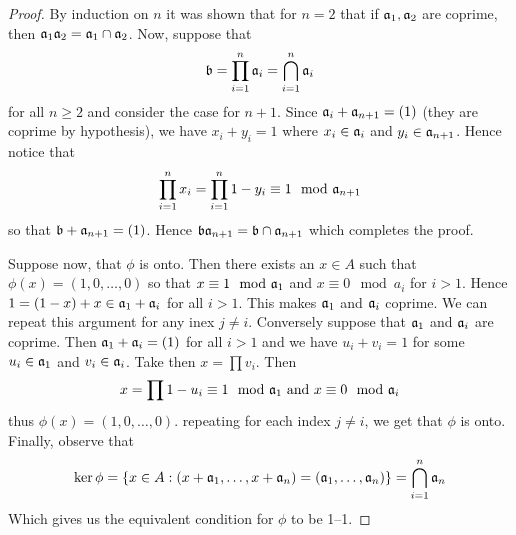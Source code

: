 \begin{proof}
    By induction on $n$ it was shown that for $n=2$ that if $\mathfrak{a}_1,\mathfrak{a}_2$ are
    coprime, then $\mathfrak{a}_1\mathfrak{a}_2=\mathfrak{a}_1 \cap \mathfrak{a}_2$. Now, suppose that
    \begin{equation*}
        \mathfrak{b}=\prod_{i=1}^n{\mathfrak{a}_i}=\bigcap_{i=1}^n{\mathfrak{a}_i}
    \end{equation*}
    for all $n \geq 2$ and consider the case for $n+1$. Since
    $\mathfrak{a}_i+\mathfrak{a}_{n+1}=(1)$ (they are coprime by hypothesis), we have $x_i+y_i=1$
    where  $x_i \in \mathfrak{a}_i$ and  $y_i \in \mathfrak{a}_{n+1}$. Hence notice that
    \begin{equation*}
        \prod_{i=1}^n{x_i}=\prod_{i=1}^n{1-y_i} \equiv 1 \mod{\mathfrak{a}_{n+1}}
    \end{equation*}
    so that $\mathfrak{b}+\mathfrak{a}_{n+1}=(1)$. Hence $\mathfrak{b}\mathfrak{a}_{n+1}=\mathfrak{b} \cap \mathfrak{a}_{n+1}$ which
    completes the proof.

    Suppose now, that $\phi$ is onto. Then there exists an  $x \in A$ such that
     $\phi(x)=(1,0, \dots, 0)$ so that $x \equiv 1 \mod{\mathfrak{a}_1}$ and $x \equiv 0
     \mod{a_i}$ for $i>1$. Hence  $1=(1-x)+x \in \mathfrak{a}_1+\mathfrak{a}_i$ for all $i>1$.
     This makes  $\mathfrak{a}_1$ and $\mathfrak{a}_i$ coprime. We can repeat this argument for
     any inex  $j \neq i$. Conversely suppose that $\mathfrak{a}_1$ and $\mathfrak{a}_i$ are
     coprime. Then $\mathfrak{a}_1+\mathfrak{a}_i=(1)$ for all $i>1$ and we have  $u_i+v_i=1$ for
     some  $u_i \in \mathfrak{a}_1$ and $v_i \in \mathfrak{a}_i$. Take then  $x=\prod{v_i}$. Then
     \begin{equation*}
         x=\prod{1-u_i} \equiv 1 \mod{\mathfrak{a}_1} \text{ and } x \equiv 0 \mod{\mathfrak{a}_i}
     \end{equation*}
     thus $\phi(x)=(1,0, \dots, 0)$. repeating for each index $j \neq i$, we get
     that  $\phi$ is onto. Finally, observe that
     \begin{equation*}
        \ker{\phi}=\{x \in A : (x+\mathfrak{a}_1, \dots,x+\mathfrak{a}_n)=(\mathfrak{a}_1, \dots, \mathfrak{a}_n)\}=
      \bigcap_{i=1}^n{\mathfrak{a}_n}
     \end{equation*}
     Which gives us the equivalent condition for $\phi$ to be 1--1.
\end{proof}

